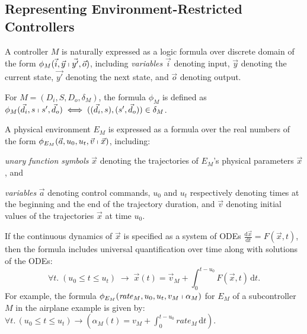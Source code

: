 \subsection{Representing Environment-Restricted Controllers}
\label{sec:discrete-encoding}

A controller $M$ is naturally 
expressed as a logic formula over discrete domain
of the form $\phi_M(\vec{i}, \vec{y} \shortmid \vec{y'}, \vec{o})$,
including \emph{variables}
$\vec{i}$ denoting input, 
$\vec{y}$ denoting the current state, 
$\vec{y'}$ denoting the next state, and 
$\vec{o}$  denoting output.

\begin{definition}
For  $M = (D_i,S,D_o,\delta_M)$,
the formula $\phi_M$ is defined as
$\phi_{M}(\vec{d}_i, s \shortmid s',  \vec{d}_o)
\iff
( (\vec{d}_i, s), (s', \vec{d}_o) ) \in \delta_{M}$.
\end{definition}



A physical environment $E_M$ is expressed as 
a formula over the real numbers %
of the form $\phi_{E_M}(\vec{a},u_0,u_t,\vec{v} \shortmid \vec{x})$,
including: \begin{inparaenum}[(i)]
	\item \emph{unary function symbols} $\vec{x}$ denoting the trajectories of $E_M$'s physical parameters $\vec{x}$,
	and
	\item \emph{variables} $\vec{a}$ denoting control commands, %
		$u_0$ and $u_t$ respectively denoting 
		times at the beginning and the end of the trajectory duration, and 
		$\vec{v}$ denoting initial values of the trajectories $\vec{x}$ at time $u_0$.
\end{inparaenum}


If the continuous dynamics of $\vec{x}$ is specified as a system of ODEs 
$\frac{\mathrm{d}\vec{x}}{\mathrm{d}t}= F(\vec{x},t)$, then the formula %
includes universal quantification over time along with solutions of the ODEs:
\[
\forall t.\; (u_0 \leq t \leq u_t) 
\;\rightarrow\;
\vec{x}(t) = \vec{v}_M + \int_0^{t-u_0}  F(\vec{x},t)\,\mathrm{d}t.
\]
For example, 
the formula $\phi_{E_M}(\mathit{rate}_M,u_0,u_t,v_M \shortmid \alpha_M)$
for 
$E_M$ of a subcontroller $M$ in the airplane example is given by:
$\forall t.\, (u_0 \leq t \leq u_t) \rightarrow (\alpha_M(t) = v_M + \int_0^{t-u_0}  \mathit{rate}_M \,\mathrm{d}t)$.


